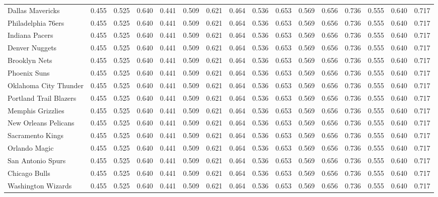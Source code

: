 \documentclass[11pt,a4paper]{article}
\begin{document}
\begin{table}[H]
\begin{tabular}{l ccc ccc ccc ccc ccc}
Dallas Mavericks & 0.455 & 0.525 & 0.640 & 0.441 & 0.509 & 0.621 & 0.464 & 0.536 & 0.653 & 0.569 & 0.656 & 0.736 & 0.555 & 0.640 & 0.717 \\
Philadelphia 76ers & 0.455 & 0.525 & 0.640 & 0.441 & 0.509 & 0.621 & 0.464 & 0.536 & 0.653 & 0.569 & 0.656 & 0.736 & 0.555 & 0.640 & 0.717 \\
Indiana Pacers & 0.455 & 0.525 & 0.640 & 0.441 & 0.509 & 0.621 & 0.464 & 0.536 & 0.653 & 0.569 & 0.656 & 0.736 & 0.555 & 0.640 & 0.717 \\
Denver Nuggets & 0.455 & 0.525 & 0.640 & 0.441 & 0.509 & 0.621 & 0.464 & 0.536 & 0.653 & 0.569 & 0.656 & 0.736 & 0.555 & 0.640 & 0.717 \\
Brooklyn Nets & 0.455 & 0.525 & 0.640 & 0.441 & 0.509 & 0.621 & 0.464 & 0.536 & 0.653 & 0.569 & 0.656 & 0.736 & 0.555 & 0.640 & 0.717 \\
Phoenix Suns & 0.455 & 0.525 & 0.640 & 0.441 & 0.509 & 0.621 & 0.464 & 0.536 & 0.653 & 0.569 & 0.656 & 0.736 & 0.555 & 0.640 & 0.717 \\
Oklahoma City Thunder & 0.455 & 0.525 & 0.640 & 0.441 & 0.509 & 0.621 & 0.464 & 0.536 & 0.653 & 0.569 & 0.656 & 0.736 & 0.555 & 0.640 & 0.717 \\
Portland Trail Blazers & 0.455 & 0.525 & 0.640 & 0.441 & 0.509 & 0.621 & 0.464 & 0.536 & 0.653 & 0.569 & 0.656 & 0.736 & 0.555 & 0.640 & 0.717 \\
Memphis Grizzlies & 0.455 & 0.525 & 0.640 & 0.441 & 0.509 & 0.621 & 0.464 & 0.536 & 0.653 & 0.569 & 0.656 & 0.736 & 0.555 & 0.640 & 0.717 \\
New Orleans Pelicans & 0.455 & 0.525 & 0.640 & 0.441 & 0.509 & 0.621 & 0.464 & 0.536 & 0.653 & 0.569 & 0.656 & 0.736 & 0.555 & 0.640 & 0.717 \\
Sacramento Kings & 0.455 & 0.525 & 0.640 & 0.441 & 0.509 & 0.621 & 0.464 & 0.536 & 0.653 & 0.569 & 0.656 & 0.736 & 0.555 & 0.640 & 0.717 \\
Orlando Magic & 0.455 & 0.525 & 0.640 & 0.441 & 0.509 & 0.621 & 0.464 & 0.536 & 0.653 & 0.569 & 0.656 & 0.736 & 0.555 & 0.640 & 0.717 \\
San Antonio Spurs & 0.455 & 0.525 & 0.640 & 0.441 & 0.509 & 0.621 & 0.464 & 0.536 & 0.653 & 0.569 & 0.656 & 0.736 & 0.555 & 0.640 & 0.717 \\
Chicago Bulls & 0.455 & 0.525 & 0.640 & 0.441 & 0.509 & 0.621 & 0.464 & 0.536 & 0.653 & 0.569 & 0.656 & 0.736 & 0.555 & 0.640 & 0.717 \\
Washington Wizards & 0.455 & 0.525 & 0.640 & 0.441 & 0.509 & 0.621 & 0.464 & 0.536 & 0.653 & 0.569 & 0.656 & 0.736 & 0.555 & 0.640 & 0.717 \\

\end{tabular}
\end{table}
\end{document}
